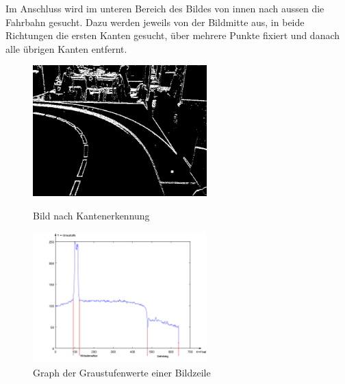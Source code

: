 Im Anschluss wird im unteren Bereich des Bildes von innen nach aussen die Fahrbahn gesucht. Dazu werden jeweils von der Bildmitte aus, in beide Richtungen die ersten Kanten gesucht, über mehrere Punkte fixiert und danach alle übrigen Kanten entfernt.\\
\begin{figure}[h!]%
\centering
\includegraphics[width=0.6\textwidth]{03_Loesungskonzept/pictures/Kantengrafik.png}
\caption{Bild nach Kantenerkennung}
\includegraphics[width=0.6\textwidth]{03_Loesungskonzept/pictures/graphPicture.png}
\caption{Graph der Graustufenwerte einer Bildzeile}
\label{fig:grayscale}
\end{figure}\\

